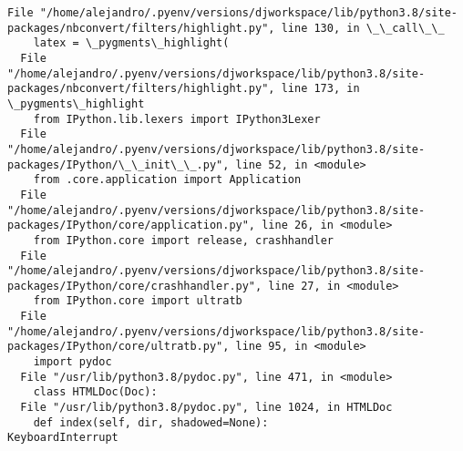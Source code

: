 \documentclass[11pt]{article}
\begin{document}
\begin{Verbatim}[commandchars=\\\{\}]
  File "/home/alejandro/.pyenv/versions/djworkspace/lib/python3.8/site-
packages/nbconvert/filters/highlight.py", line 130, in \_\_call\_\_
    latex = \_pygments\_highlight(
  File "/home/alejandro/.pyenv/versions/djworkspace/lib/python3.8/site-
packages/nbconvert/filters/highlight.py", line 173, in \_pygments\_highlight
    from IPython.lib.lexers import IPython3Lexer
  File "/home/alejandro/.pyenv/versions/djworkspace/lib/python3.8/site-
packages/IPython/\_\_init\_\_.py", line 52, in <module>
    from .core.application import Application
  File "/home/alejandro/.pyenv/versions/djworkspace/lib/python3.8/site-
packages/IPython/core/application.py", line 26, in <module>
    from IPython.core import release, crashhandler
  File "/home/alejandro/.pyenv/versions/djworkspace/lib/python3.8/site-
packages/IPython/core/crashhandler.py", line 27, in <module>
    from IPython.core import ultratb
  File "/home/alejandro/.pyenv/versions/djworkspace/lib/python3.8/site-
packages/IPython/core/ultratb.py", line 95, in <module>
    import pydoc
  File "/usr/lib/python3.8/pydoc.py", line 471, in <module>
    class HTMLDoc(Doc):
  File "/usr/lib/python3.8/pydoc.py", line 1024, in HTMLDoc
    def index(self, dir, shadowed=None):
KeyboardInterrupt
    \end{Verbatim}


    
    
    
\end{document}
